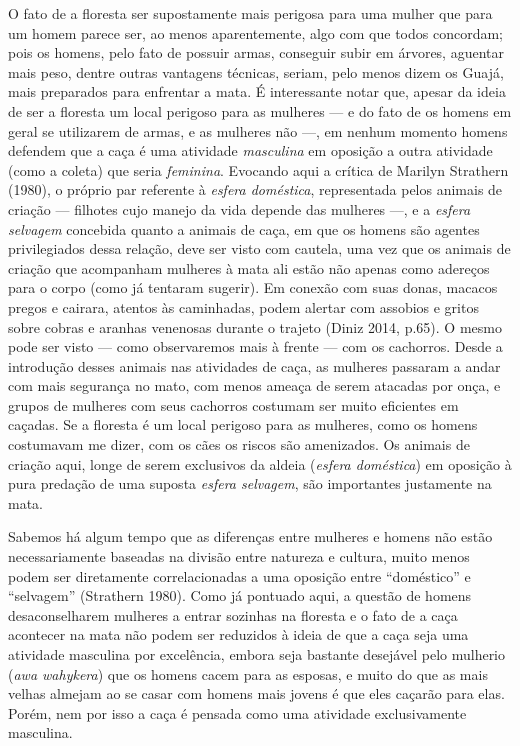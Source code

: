 O fato de a floresta ser supostamente mais perigosa para uma mulher que
para um homem parece ser, ao menos aparentemente, algo com que todos
concordam; pois os homens, pelo fato de possuir armas, conseguir subir
em árvores, aguentar mais peso, dentre outras vantagens técnicas,
seriam, pelo menos dizem os Guajá, mais preparados para enfrentar a
mata. É interessante notar que, apesar da ideia de ser a floresta um
local perigoso para as mulheres --- e do fato de os homens em geral se
utilizarem de armas, e as mulheres não ---, em nenhum momento homens
defendem que a caça é uma atividade \emph{masculina} em oposição a outra
atividade (como a coleta) que seria \emph{feminina}. Evocando aqui a
crítica de Marilyn Strathern (1980), o próprio par referente à
\emph{esfera doméstica}, representada pelos animais de criação ---
filhotes cujo manejo da vida depende das mulheres ---, e a \emph{esfera
selvagem} concebida quanto a animais de caça, em que os homens são
agentes privilegiados dessa relação, deve ser visto com cautela, uma vez
que os animais de criação que acompanham mulheres à mata ali estão não
apenas como adereços para o corpo (como já tentaram sugerir). Em conexão
com suas donas, macacos pregos e cairara, atentos às caminhadas, podem
alertar com assobios e gritos sobre cobras e aranhas venenosas durante o
trajeto (Diniz 2014, p.65). O mesmo pode ser visto --- como observaremos
mais à frente --- com os cachorros. Desde a introdução desses animais nas
atividades de caça, as mulheres passaram a andar com mais segurança no
mato, com menos ameaça de serem atacadas por onça, e grupos de mulheres
com seus cachorros costumam ser muito eficientes em caçadas. Se a
floresta é um local perigoso para as mulheres, como os homens costumavam
me dizer, com os cães os riscos são amenizados. Os animais de criação
aqui, longe de serem exclusivos da aldeia (\emph{esfera doméstica}) em
oposição à pura predação de uma suposta \emph{esfera selvagem}, são
importantes justamente na mata.

Sabemos há algum tempo que as diferenças entre mulheres e homens não
estão necessariamente baseadas na divisão entre natureza e cultura,
muito menos podem ser diretamente correlacionadas a uma oposição entre
``doméstico'' e ``selvagem'' (Strathern 1980). Como já pontuado aqui, a
questão de homens desaconselharem mulheres a entrar sozinhas na floresta
e o fato de a caça acontecer na mata não podem ser reduzidos à ideia de
que a caça seja uma atividade masculina por excelência, embora seja
bastante desejável pelo mulherio (\emph{awa wahykera}) que os homens
cacem para as esposas, e muito do que as mais velhas almejam ao se casar
com homens mais jovens é que eles caçarão para elas. Porém, nem por isso
a caça é pensada como uma atividade exclusivamente masculina.

